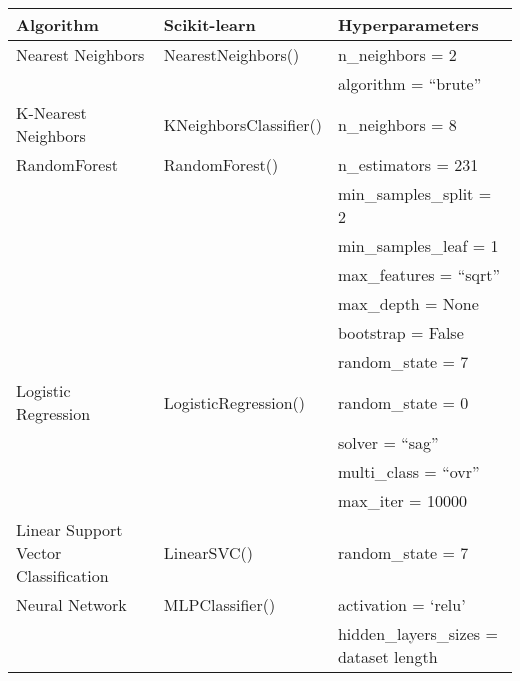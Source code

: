 \begin{tabular}{lll}
    \toprule
    \textbf{Algorithm}                  & \textbf{Scikit-learn}     & \textbf{Hyperparameters}  \\
    \midrule
    Nearest Neighbors                   & NearestNeighbors()        & n\_neighbors = 2          \\
                                        &                           & algorithm = “brute”       \\
    \midrule
    K-Nearest Neighbors                 & KNeighborsClassifier()    & n\_neighbors = 8          \\
    \midrule
    RandomForest                        & RandomForest()            & n\_estimators = 231       \\
                                        &                           & min\_samples\_split = 2   \\
                                        &                           & min\_samples\_leaf = 1    \\
                                        &                           & max\_features = “sqrt”    \\
                                        &                           & max\_depth = None         \\
                                        &                           & bootstrap = False         \\
                                        &                           & random\_state = 7         \\
    \midrule
    Logistic Regression                 & LogisticRegression()      & random\_state = 0         \\
                                        &                           & solver = “sag”            \\
                                        &                           & multi\_class = “ovr”      \\
                                        &                           & max\_iter = 10000         \\
    \midrule
    Linear Support Vector Classification& LinearSVC()               & random\_state = 7         \\
    \midrule
    Neural Network                      & MLPClassifier()           & activation = ‘relu’       \\
                                        &                           & hidden\_layers\_sizes = dataset length    \\

\end{tabular}

